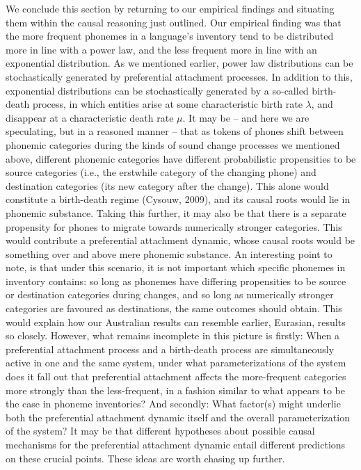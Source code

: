 We conclude this section by returning to our empirical findings and situating them within the causal reasoning just outlined. Our empirical finding was that the more frequent phonemes in a language's inventory tend to be distributed more in line with a power law, and the less frequent more in line with an exponential distribution. As we mentioned earlier, power law distributions can be stochastically generated by preferential attachment processes. In addition to this, exponential distributions can be stochastically generated by a so-called birth-death process, in which entities arise at some characteristic birth rate \(\lambda\), and disappear at a characteristic death rate \(\mu\). It may be -- and here we are speculating, but in a reasoned manner -- that as tokens of phones shift between phonemic categories during the kinds of sound change processes we mentioned above, different phonemic categories have different probabilistic propensities to be source categories (i.e., the erstwhile category of the changing phone) and destination categories (its new category after the change). This alone would constitute a birth-death regime (Cysouw, 2009), and its causal roots would lie in phonemic substance. Taking this further, it may also be that there is a separate propensity for phones to migrate towards numerically stronger categories. This would contribute a preferential attachment dynamic, whose causal roots would be something over and above mere phonemic substance. An interesting point to note, is that under this scenario, it is not important which specific phonemes in inventory contains: so long as phonemes have differing propensities to be source or destination categories during changes, and so long as numerically stronger categories are favoured as destinations, the same outcomes should obtain. This would explain how our Australian results can resemble earlier, Eurasian, results so closely. However, what remains incomplete in this picture is firstly: When a preferential attachment process and a birth-death process are simultaneously active in one and the same system, under what parameterizations of the system does it fall out that preferential attachment affects the more-frequent categories more strongly than the less-frequent, in a fashion similar to what appears to be the case in phoneme inventories? And secondly: What factor(s) might underlie both the preferential attachment dynamic itself and the overall parameterization of the system? It may be that different hypotheses about possible causal mechanisms for the preferential attachment dynamic entail different predictions on these crucial points. These ideas are worth chasing up further. \newline

